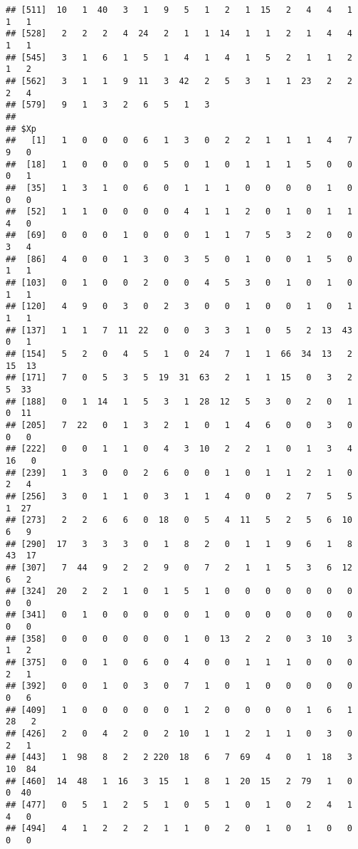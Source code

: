 \documentclass[]{article}
\begin{document}
\begin{verbatim}
## [511]  10   1  40   3   1   9   5   1   2   1  15   2   4   4   1   1   1
## [528]   2   2   2   4  24   2   1   1  14   1   1   2   1   4   4   1   1
## [545]   3   1   6   1   5   1   4   1   4   1   5   2   1   1   2   1   2
## [562]   3   1   1   9  11   3  42   2   5   3   1   1  23   2   2   2   4
## [579]   9   1   3   2   6   5   1   3
## 
## $Xp
##   [1]   1   0   0   0   6   1   3   0   2   2   1   1   1   4   7   9   0
##  [18]   1   0   0   0   0   5   0   1   0   1   1   1   5   0   0   0   1
##  [35]   1   3   1   0   6   0   1   1   1   0   0   0   0   1   0   0   0
##  [52]   1   1   0   0   0   0   4   1   1   2   0   1   0   1   1   4   0
##  [69]   0   0   0   1   0   0   0   1   1   7   5   3   2   0   0   3   4
##  [86]   4   0   0   1   3   0   3   5   0   1   0   0   1   5   0   1   1
## [103]   0   1   0   0   2   0   0   4   5   3   0   1   0   1   0   1   1
## [120]   4   9   0   3   0   2   3   0   0   1   0   0   1   0   1   1   1
## [137]   1   1   7  11  22   0   0   3   3   1   0   5   2  13  43   0   1
## [154]   5   2   0   4   5   1   0  24   7   1   1  66  34  13   2  15  13
## [171]   7   0   5   3   5  19  31  63   2   1   1  15   0   3   2   5  33
## [188]   0   1  14   1   5   3   1  28  12   5   3   0   2   0   1   0  11
## [205]   7  22   0   1   3   2   1   0   1   4   6   0   0   3   0   0   0
## [222]   0   0   1   1   0   4   3  10   2   2   1   0   1   3   4  16   0
## [239]   1   3   0   0   2   6   0   0   1   0   1   1   2   1   0   2   4
## [256]   3   0   1   1   0   3   1   1   4   0   0   2   7   5   5   1  27
## [273]   2   2   6   6   0  18   0   5   4  11   5   2   5   6  10   6   9
## [290]  17   3   3   3   0   1   8   2   0   1   1   9   6   1   8  43  17
## [307]   7  44   9   2   2   9   0   7   2   1   1   5   3   6  12   6   2
## [324]  20   2   2   1   0   1   5   1   0   0   0   0   0   0   0   0   0
## [341]   0   1   0   0   0   0   0   1   0   0   0   0   0   0   0   0   0
## [358]   0   0   0   0   0   0   1   0  13   2   2   0   3  10   3   1   2
## [375]   0   0   1   0   6   0   4   0   0   1   1   1   0   0   0   2   1
## [392]   0   0   1   0   3   0   7   1   0   1   0   0   0   0   0   0   6
## [409]   1   0   0   0   0   0   1   2   0   0   0   0   1   6   1  28   2
## [426]   2   0   4   2   0   2  10   1   1   2   1   1   0   3   0   2   1
## [443]   1  98   8   2   2 220  18   6   7  69   4   0   1  18   3  10  84
## [460]  14  48   1  16   3  15   1   8   1  20  15   2  79   1   0   0  40
## [477]   0   5   1   2   5   1   0   5   1   0   1   0   2   4   1   4   0
## [494]   4   1   2   2   2   1   1   0   2   0   1   0   1   0   0   0   0

\end{verbatim}
\end{document}
